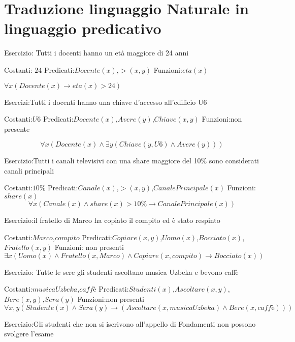 \section{Traduzione linguaggio Naturale in linguaggio predicativo}

Esercizio: Tutti i docenti hanno un età maggiore di 24 anni

Costanti: $24$
Predicati:$Docente(x)$,$>(x,y)$
Funzioni:$eta(x)$

$\forall x (Docente(x) \rightarrow eta(x) > 24)$

Esercizi:Tutti i docenti hanno una chiave d'accesso all'edificio U6

Costanti:$U6$
Predicati:$Docente(x)$,$Avere(y)$,$Chiave(x,y)$
Funzioni:non presente

\begin{equation*}
    \forall x (Docente(x) \land \exists y (Chiave(y,U6) \land Avere(y)))
\end{equation*}

Esercizio:Tutti i canali televisivi con una share maggiore del 10\% sono
          considerati canali principali

Costanti:$10\%$
Predicati:$Canale(x)$,$>(x,y)$,$CanalePrincipale(x)$
Funzioni:$share(x)$
\begin{equation*}
    \forall x (Canale(x) \land share(x) > 10\% \rightarrow CanalePrincipale(x))
\end{equation*}

Esercizio:il fratello di Marco ha copiato il compito ed è stato respinto

Costanti:$Marco$,$compito$
Predicati:$Copiare(x,y)$,$Uomo(x)$,$Bocciato(x)$,$Fratello(x,y)$
Funzioni: non presenti
\begin{equation*}
    \exists x (Uomo(x) \land Fratello(x,Marco) \land Copiare(x,compito) \rightarrow Bocciato(x))
\end{equation*}

Esercizio: Tutte le sere gli studenti ascoltano musica Uzbeka e bevono caffè

Costanti:$musicaUzbeka$,$caffè$
Predicati:$Studenti(x)$,$Ascoltare(x,y)$,$Bere(x,y)$,$Sera(y)$
Funzioni:non presenti
\begin{equation*}
\forall x,y (Studente(x) \land Sera(y) \rightarrow (Ascoltare(x,musicaUzbeka) \land Bere(x,caffè)))
\end{equation*}

Esercizio:Gli studenti che non si iscrivono all'appello di Fondamenti non possono svolgere l'esame


